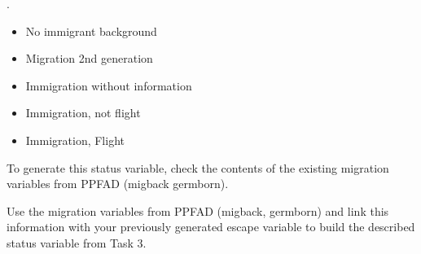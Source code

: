 \documentclass[letterpaper,10pt,openany,onesideH,english]{sphinxmanual}
\begin{document}
\begin{figure}[H]
\centering

\noindent{}
\end{figure}

.
\begin{itemize}
\item {} 
No immigrant background

\item {} 
Migration 2nd generation

\item {} 
Immigration without information

\item {} 
Immigration, not flight

\item {} 
Immigration, Flight

\end{itemize}

To generate this status variable, check the contents of the existing migration variables from PPFAD (migback germborn).

%
\begin{sphinxVerbatim}[commandchars=\\\{\},numbers=left,firstnumber=1,stepnumber=1]
       

 
\end{sphinxVerbatim}

\begin{figure}[H]
\centering

\noindent{}
\end{figure}

%
\begin{sphinxVerbatim}[commandchars=\\\{\},numbers=left,firstnumber=1,stepnumber=1]
 
\end{sphinxVerbatim}

\begin{figure}[H]
\centering

\noindent{}
\end{figure}

Use the migration variables from PPFAD (migback, germborn) and link this information with your previously generated escape variable to build the described status variable from Task 3.
\end{document}
